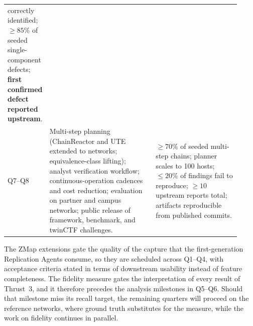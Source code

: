 {\begin{longtable}{@{}p{0.06\linewidth}p{0.48\linewidth}p{0.385\linewidth}@{}}
     correctly identified; $\geq 85\%$ of seeded single-component defects;
     \textbf{first confirmed defect reported upstream}.\\
\addlinespace[2pt]
Q7--Q8 & Multi-step planning (ChainReactor and UTE extended to networks;
     equivalence-class lifting); analyst verification workflow;
     continuous-operation cadences and cost reduction; evaluation on partner
     and campus networks; public release of framework, benchmark, and twinCTF
     challenges.
   & $\geq 70\%$ of seeded multi-step chains; planner scales to 100 hosts;
     $\leq 20\%$ of findings fail to reproduce; $\geq 10$ upstream reports
     total; artifacts reproducible from published commits.\\
\bottomrule
\end{longtable}}

The ZMap extensions gate the quality of the capture that the
first-generation Replication Agents consume, so they are scheduled across
Q1--Q4, with acceptance criteria stated in terms of downstream usability
instead of feature completeness. The fidelity measure gates the interpretation
of every result of Thrust~3, and it therefore precedes the analysis milestones
in Q5--Q6. Should that milestone miss its recall target, the remaining
quarters will proceed on the reference networks, where ground truth
substitutes for the measure, while the work on fidelity continues in parallel.
